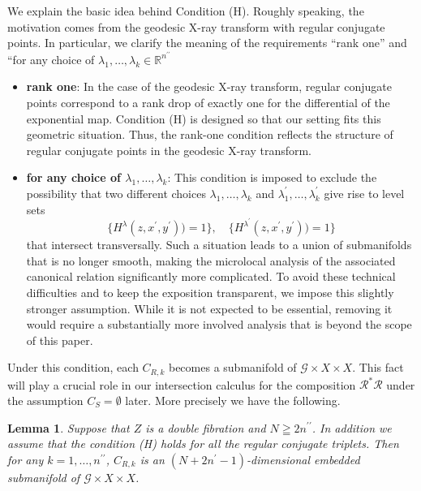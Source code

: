 \documentclass[a4paper,11pt,reqno]{amsart}
\newtheorem{lemma}[theorem]{Lemma}
\theoremstyle{definition}
\theoremstyle{remark}
\begin{document}
%
%
\par
%
%
We explain the basic idea behind Condition (H). Roughly speaking, the motivation comes from the geodesic X-ray transform with regular conjugate points. In particular, we clarify the meaning of the requirements “rank one” and “for any choice of $\lambda_1,\dotsc,\lambda_k \in \mathbb{R}^{n^{\prime\prime}}$
%
%
\begin{itemize}
\item 
{\bf rank one}: 
In the case of the geodesic X-ray transform, regular conjugate points correspond to a rank drop of exactly one for the differential of the exponential map. Condition (H) is designed so that our setting fits this geometric situation. Thus, the rank-one condition reflects the structure of regular conjugate points in the geodesic X-ray transform. 
\item 
{\bf for any choice of $\lambda_1,\dotsc,\lambda_k$}: 
This condition is imposed to exclude the possibility that two different choices 
$\lambda_1,\dotsc,\lambda_k$ 
and 
$\lambda_1^\prime,\dotsc,\lambda_k^\prime$ 
give rise to level sets
%
%
$$
\{H^{\lambda}(z,x^\prime,y^\prime)\bigr)=1\}, 
\quad
\{H^{\lambda^\prime}(z,x^\prime,y^\prime)\bigr)=1\}
$$
%
%
that intersect transversally. Such a situation leads to a union of submanifolds that is no longer smooth, making the microlocal analysis of the associated canonical relation significantly more complicated. To avoid these technical difficulties and to keep the exposition transparent, we impose this slightly stronger assumption. While it is not expected to be essential, removing it would require a substantially more involved analysis that is beyond the scope of this paper. 
\end{itemize}
%
%
\par
%
%
Under this condition, each $C_{R,k}$ becomes a submanifold of $\mathcal{G}{\times}X{\times}X$. 
This fact will play a crucial role in our intersection calculus for the composition 
$\mathcal{R}^{\ast}\mathcal{R}$ under the assumption $C_S=\emptyset$ later. 
More precisely we have the following. 
%
%
\begin{lemma}
\label{theorem:submanifold} 
Suppose that $Z$ is a double fibration and $N \geqq 2n^{\prime\prime}$. 
In addition we assume that the condition {\rm (H)} holds 
for all the regular conjugate triplets. 
Then for any $k=1,\dotsc,n^{\prime\prime}$, 
$C_{R,k}$ is an $(N+2n^\prime-1)$-dimensional embedded submanifold of $\mathcal{G}{\times}X{\times}X$. 
\end{lemma}
%
%
\end{document}
